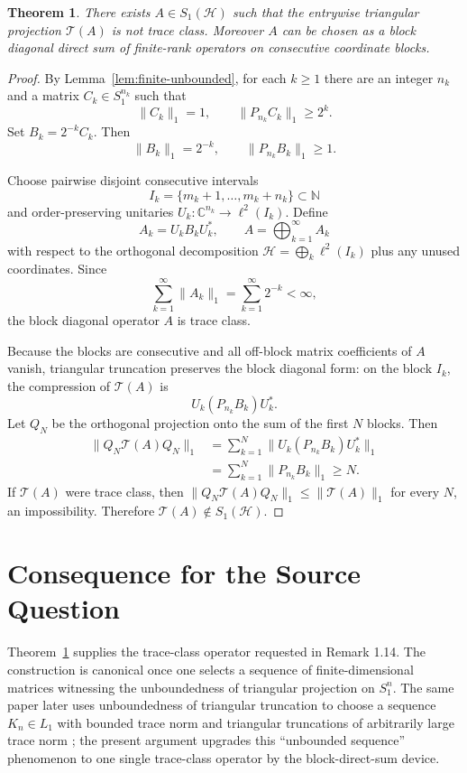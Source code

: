 \documentclass[11pt]{amsart}
\newtheorem{theorem}{Theorem}
\newcommand{\Hh}{\mathcal H}
\newcommand{\N}{\mathbb N}
\begin{document}
\begin{theorem}
\label{thm:witness}
There exists \(A\in S_1(\Hh)\) such that the entrywise triangular projection
\(\mathcal T(A)\) is not trace class. Moreover \(A\) can be chosen as a block
diagonal direct sum of finite-rank operators on consecutive coordinate blocks.
\end{theorem}

\begin{proof}
By Lemma~\ref{lem:finite-unbounded}, for each \(k\ge1\) there are an integer
\(n_k\) and a matrix \(C_k\in S_1^{n_k}\) such that
\[
  \|C_k\|_1=1,\qquad \|P_{n_k}C_k\|_1\ge 2^k.
\]
Set \(B_k=2^{-k}C_k\). Then
\[
  \|B_k\|_1=2^{-k}, \qquad \|P_{n_k}B_k\|_1\ge 1.
\]

Choose pairwise disjoint consecutive intervals
\[
  I_k=\{m_k+1,\ldots,m_k+n_k\}\subset\N
\]
and order-preserving unitaries \(U_k:\mathbb C^{n_k}\to \ell^2(I_k)\). Define
\[
  A_k=U_kB_kU_k^*,\qquad
  A=\bigoplus_{k=1}^{\infty} A_k
\]
with respect to the orthogonal decomposition
\(\Hh=\bigoplus_k \ell^2(I_k)\) plus any unused coordinates. Since
\[
  \sum_{k=1}^\infty \|A_k\|_1
  =\sum_{k=1}^\infty 2^{-k}<\infty,
\]
the block diagonal operator \(A\) is trace class.

Because the blocks are consecutive and all off-block matrix coefficients of
\(A\) vanish, triangular truncation preserves the block diagonal form:
on the block \(I_k\), the compression of \(\mathcal T(A)\) is
\[
  U_k(P_{n_k}B_k)U_k^*.
\]
Let \(Q_N\) be the orthogonal projection onto the sum of the first \(N\)
blocks. Then
\[
\begin{aligned}
  \|Q_N\mathcal T(A)Q_N\|_1
    &= \sum_{k=1}^{N}\|U_k(P_{n_k}B_k)U_k^*\|_1  \\
    &= \sum_{k=1}^{N}\|P_{n_k}B_k\|_1
     \ge N .
\end{aligned}
\]
If \(\mathcal T(A)\) were trace class, then
\(\|Q_N\mathcal T(A)Q_N\|_1\le \|\mathcal T(A)\|_1\) for every \(N\), an
impossibility. Therefore \(\mathcal T(A)\notin S_1(\Hh)\).
\end{proof}

\section*{Consequence for the Source Question}

Theorem~\ref{thm:witness} supplies the trace-class operator requested in
Remark 1.14. The construction is canonical once one selects a sequence of
finite-dimensional matrices witnessing the unboundedness of triangular
projection on \(S_1^n\). The same paper later uses unboundedness of triangular
truncation to choose a sequence \(K_n\in L_1\) with bounded trace norm and
triangular truncations of arbitrarily large trace norm
\cite[Proposition 7.1 proof]{Tumpach2018}; the present argument upgrades this
``unbounded sequence'' phenomenon to one single trace-class operator by the
block-direct-sum device.
\end{document}
